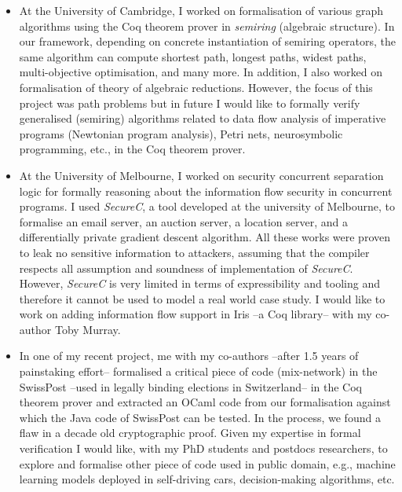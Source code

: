 \documentclass[a4paper]{article}
\begin{document}
\begin{itemize}
\begin{itemize}
	\end{itemize}

\item At the University of Cambridge, I worked on formalisation of 
various graph algorithms using the Coq theorem prover in \emph{semiring} 
(algebraic structure). In our framework, depending on concrete 
instantiation of semiring operators,
the same algorithm can compute shortest path, longest paths, widest paths, 
multi-objective optimisation, and many more. In addition, 
I also worked on formalisation of theory of algebraic reductions. 
However, the focus of this project was path problems but in future I would 
like to formally verify generalised (semiring) algorithms related to 
data flow analysis of imperative programs (Newtonian program analysis), Petri nets, 
neurosymbolic programming, etc., in the Coq theorem prover.



\item At the University of Melbourne, I worked on 
security concurrent separation logic for formally reasoning about the information 
flow security in concurrent programs. I used \textit{SecureC}, a tool developed at the university of 
Melbourne, to formalise an email server, an auction server, a location server, and 
a differentially private gradient descent algorithm. 
All these works were proven to leak no sensitive 
information to attackers, assuming that the compiler respects all 
assumption and soundness of implementation of \textit{SecureC}. However, 
\textit{SecureC} is very limited in terms of expressibility and tooling 
and therefore it cannot be used to model a real world case study. I would like to work on 
adding information flow support in Iris --a Coq library-- with my co-author Toby Murray. 


\item In one of my recent project, me with my co-authors --after 1.5 years of 
painstaking effort-- formalised a critical 
piece of code (mix-network) in the SwissPost --used in legally binding elections 
in Switzerland-- in the Coq theorem prover and extracted an OCaml code from our 
formalisation against which the Java code of SwissPost can be tested. 
In the process, we found a flaw in a decade old cryptographic proof.  Given my 
expertise in formal verification I would like, with my PhD students and 
postdocs researchers, to explore and formalise other 
piece of code used in public domain, e.g., machine learning 
models deployed in self-driving cars, decision-making algorithms, etc. 

\end{itemize}	
\end{document}
